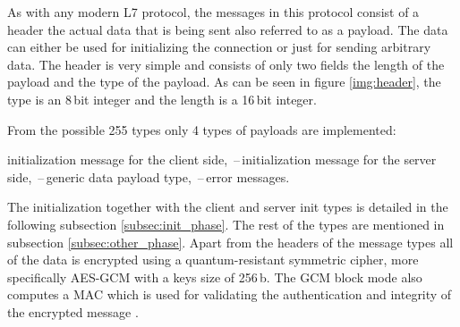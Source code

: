 As with any modern L7 protocol, the messages in this protocol consist of a header the actual data that is being sent also referred to as a payload. The data can either be used for initializing the connection or just for sending arbitrary data. The header is very simple and consists of only two fields the length of the payload and the type of the payload. As can be seen in figure \ref{img:header}, the type is an 8\,bit integer and the length is a 16\,bit integer.

\noindent From the possible 255 types only 4 types of payloads are implemented:
\begin{itemize}
  initialization message for the client side,
  \,--\,initialization message for the server side,
  \,--\,generic data payload type,
  \,--\,error messages.
\end{itemize}
The initialization together with the client and server init types is detailed in the following subsection \ref{subsec:init_phase}. The rest of the types are mentioned in subsection \ref{subsec:other_phase}. Apart from the headers of the message types all of the data is encrypted using a quantum-resistant symmetric cipher, more specifically AES-GCM with a keys size of 256\,b. The GCM block mode also computes a MAC which is used for validating the authentication and integrity of the encrypted message \cite{Paar2010}.
